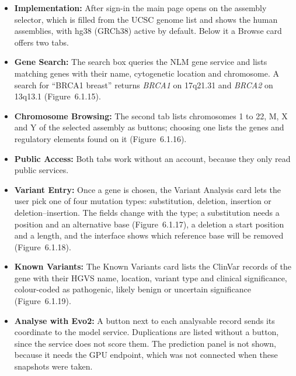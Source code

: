 \begin{itemize}
\item \textbf{Implementation:} After sign-in the main page opens on the assembly selector, which is filled from the UCSC genome list and shows the human assemblies, with hg38 (GRCh38) active by default. Below it a Browse card offers two tabs.
\item \textbf{Gene Search:} The search box queries the NLM gene service and lists matching genes with their name, cytogenetic location and chromosome. A search for ``BRCA1 breast'' returns \textit{BRCA1} on 17q21.31 and \textit{BRCA2} on 13q13.1 (Figure~6.1.15).
\item \textbf{Chromosome Browsing:} The second tab lists chromosomes 1 to 22, M, X and Y of the selected assembly as buttons; choosing one lists the genes and regulatory elements found on it (Figure~6.1.16).
\item \textbf{Public Access:} Both tabs work without an account, because they only read public services.
\end{itemize}

\begin{itemize}
\item \textbf{Variant Entry:} Once a gene is chosen, the Variant Analysis card lets the user pick one of four mutation types: substitution, deletion, insertion or deletion--insertion. The fields change with the type; a substitution needs a position and an alternative base (Figure~6.1.17), a deletion a start position and a length, and the interface shows which reference base will be removed (Figure~6.1.18).
\item \textbf{Known Variants:} The Known Variants card lists the ClinVar records of the gene with their HGVS name, location, variant type and clinical significance, colour-coded as pathogenic, likely benign or uncertain significance (Figure~6.1.19).
\item \textbf{Analyse with Evo2:} A button next to each analysable record sends its coordinate to the model service. Duplications are listed without a button, since the service does not score them. The prediction panel is not shown, because it needs the GPU endpoint, which was not connected when these snapshots were taken.
\end{itemize}

